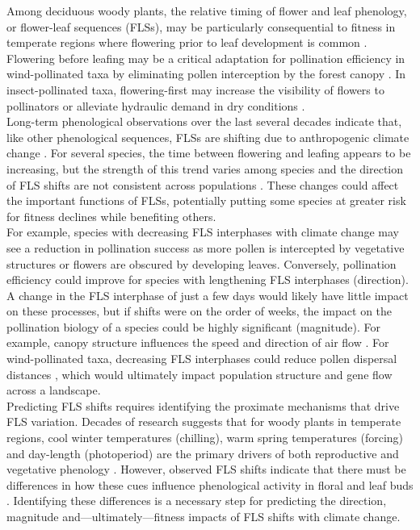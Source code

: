 \documentclass[11pt]{article}\usepackage[]{graphicx}\usepackage[]{color}
\begin{document}
\noindent Among deciduous woody plants, the relative timing of flower and leaf phenology, or flower-leaf sequences (FLSs), may be particularly consequential to fitness in temperate regions where flowering prior to leaf development is common \citep{Rathcke_1985,Gougherty2018}. Flowering before leafing may be a critical adaptation for pollination efficiency in wind-pollinated taxa by eliminating pollen interception by the forest canopy \citep{Whitehead1969}. In insect-pollinated taxa, flowering-first may increase the visibility of flowers to pollinators \citep{Janzen1967,Savage2019} or alleviate hydraulic demand in dry conditions \citep{Gougherty2018, Franklin2016}.\\

\noindent Long-term phenological observations over the last several decades indicate that, like other phenological sequences, FLSs are shifting due to anthropogenic climate change \citep{Buonaiuto2020}. For several species, the time between flowering and leafing appears to be increasing, but the strength of this trend varies among species and the direction of FLS shifts are not consistent across populations \citep{Buonaiuto2020}. These changes could affect the important functions of FLSs, potentially putting some species at greater risk for fitness declines while benefiting others.\\

\noindent For example, species with decreasing FLS interphases with climate change may see a reduction in pollination success as more pollen is intercepted by vegetative structures or flowers are obscured by developing leaves. Conversely, pollination efficiency could improve for species with lengthening FLS interphases (direction). A change in the FLS interphase of just a few days would likely have little impact on these processes, but if shifts were on the order of weeks, the impact on the pollination biology of a species could be highly significant (magnitude). For example, canopy structure influences the speed and direction of air flow \citep{Niklas1985, Jackson:1999aa}. For wind-pollinated taxa, decreasing FLS interphases could reduce pollen dispersal distances \citep{Milleron2012}, which would ultimately impact population structure and gene flow across a landscape.\\

\noindent Predicting FLS shifts requires identifying the proximate mechanisms that drive FLS variation. Decades of research suggests that for woody plants in temperate regions, cool winter temperatures (chilling), warm spring temperatures (forcing) and day-length (photoperiod) are the primary drivers of both reproductive and vegetative phenology \citep{Forrest2010,Flynn2018}. However, observed FLS shifts indicate that there must be differences in how these cues influence phenological activity in floral and leaf buds \citep{Buonaiuto2020}. Identifying these differences is a necessary step for predicting the direction, magnitude and---ultimately---fitness impacts of FLS shifts with climate change.\\ 
\end{document}
